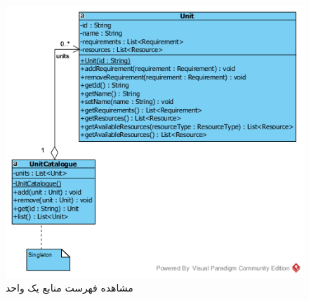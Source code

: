 \begin{landscape}
\begin{figure}[H]
	\includegraphics[scale=0.7]{img/sequence-design/ViewListOfResourcesC}
	\caption{مشاهده فهرست منابع یک واحد}
\end{figure}


\end{landscape}
